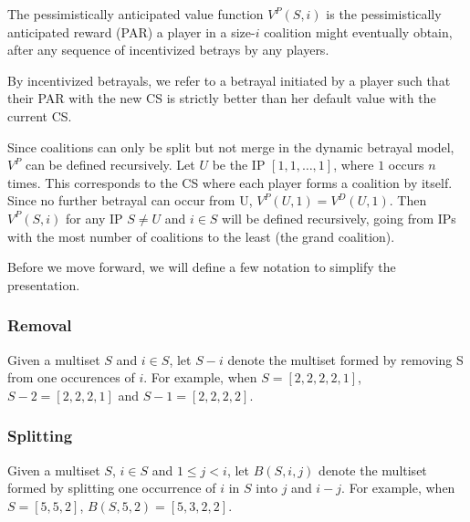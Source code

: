 \documentclass[sigconf,anonymous]{aamas}
\begin{document}
The pessimistically anticipated value function $V^P(S, i)$ is the pessimistically anticipated reward (PAR) a player in a size-$i$ coalition might eventually obtain, after any sequence of incentivized betrays by any players.

By incentivized betrayals, we refer to a betrayal initiated by a player such that their PAR with the new CS is strictly better than her default value with the current CS. 

Since coalitions can only be split but not merge in the dynamic betrayal model, $V^P$ can be defined recursively. Let $U$ be the IP $[1, 1, \dots, 1]$, where $1$ occurs $n$ times. This corresponds to the CS where each player forms a coalition by itself. Since no further betrayal can occur from U, $V^P(U, 1)=V^D(U, 1)$. Then $V^P(S, i)$ for any IP $S \neq U$ and $i \in S$ will be defined recursively, going from IPs with the most number of coalitions to the least (the grand coalition).

Before we move forward, we will define a few notation to simplify the presentation. 

\subsubsection{Removal}

Given a multiset $S$ and $i\in S$, let $S - i$ denote the multiset formed by removing S from one occurences of $i$. For example, when $S=[2,2,2,2,1] $, $S-2=[2,2,2,1]$ and $S-1=[2,2,2,2]$. 

\subsubsection{Splitting}

Given a multiset $S$, $i \in S$ and $1 \leq j < i$, let $B(S, i, j)$ denote the multiset formed by splitting one occurrence of $i$ in $S$ into $j$ and $i-j$. For example, when $S=[5, 5, 2]$, $B(S, 5, 2)  =  [5, 3, 2, 2]$. 
\end{document}
